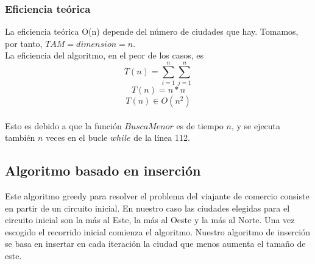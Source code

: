 \documentclass[11pt,a4paper]{article} %
\begin{document}
\subsubsection{Eficiencia teórica}
La eficiencia teórica O(n) depende del número de ciudades que hay. Tomamos, por tanto, $TAM = dimension = n$.\\

La eficiencia del algoritmo, en el peor de los casos, es 
$$T(n) = \sum_{i=1}^{n}\sum_{j=1}^{n}$$
$$T(n) = n*n$$
$$T(n) \in O(n^2)$$\\

Esto es debido a que la función $BuscaMenor$ es de tiempo $n$, y se ejecuta también $n$ veces en el bucle $while$ de la línea 112.



\newpage
\subsection{Algoritmo basado en inserción}
Este algoritmo greedy para resolver el problema del viajante de comercio consiste en partir de un circuito inicial. En nuestro caso las ciudades elegidas para el circuito inicial son la más al Este, la más al Oeste y la más al Norte. Una vez escogido el recorrido inicial comienza el algoritmo. Nuestro algoritmo de inserción se basa en insertar en cada iteración la ciudad que menos aumenta el tamaño de este.
\end{document}
